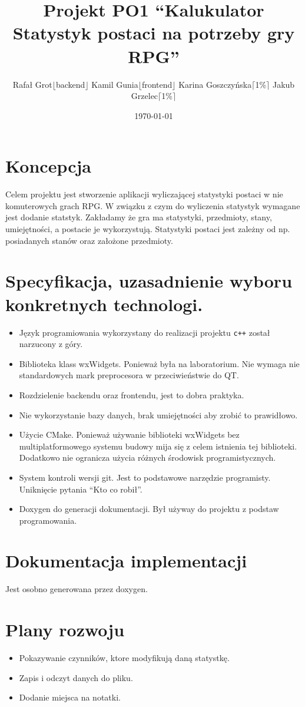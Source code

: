 \documentclass[11pt]{article}
\author{Rafał Grot\(\lfloor\)backend\(\rfloor\) Kamil Gunia\(\lfloor\)frontend\(\rfloor\) Karina Goszczyńska\(\lceil\)1\%\(\rceil\) Jakub Grzelec\(\lceil\)1\%\(\rceil\)}
\date{\today}
\title{Projekt PO1 ``Kalukulator Statystyk postaci na potrzeby gry RPG''}
\begin{document}
\maketitle
\tableofcontents

\newpage

\section{Koncepcja}
\label{sec:org64374a9}
Celem projektu jest stworzenie aplikacji wyliczającej statystyki postaci w nie komuterowych grach RPG.
W związku z czym do wyliczenia statystyk wymagane jest dodanie statstyk.
Zakładamy że gra ma statystyki, przedmioty, stany, umiejętności, a postacie je wykorzystują.
Statystyki postaci jest zależny od np. posiadanych stanów oraz założone przedmioty.
\section{Specyfikacja, uzasadnienie wyboru konkretnych technologi.}
\label{sec:orga7aaf80}
\begin{itemize}
\item Język programiowania wykorzystany do realizacji projektu \texttt{c++} został narzucony z góry.
\item Biblioteka klass wxWidgets. Ponieważ była na laboratorium. Nie wymaga nie standardowych mark preprocesora w przeciwieństwie do QT.
\item Rozdzielenie backendu oraz frontendu, jest to dobra praktyka.
\item Nie wykorzystanie bazy danych, brak umiejętności aby zrobić to prawidłowo.
\item Użycie CMake. Ponieważ używanie biblioteki wxWidgets bez multiplatformowego systemu budowy mija się z celem istnienia tej biblioteki. Dodatkowo nie ogranicza użycia różnych środowisk programistycznych.
\item System kontroli wersji git. Jest to podstawowe narzędzie programisty. Uniknięcie pytania ``Kto co robił''.
\item Doxygen do generacji dokumentacji. Był używay do projektu z podstaw programowania.
\end{itemize}
\section{Dokumentacja implementacji}
\label{sec:org0d384ae}
Jest osobno generowana przez doxygen.
\section{Plany rozwoju}
\label{sec:org3424e53}
\begin{itemize}
\item Pokazywanie czynników, ktore modyfikują daną statystkę.
\item Zapis i odczyt danych do pliku.
\item Dodanie miejsca na notatki.
\end{itemize}
\end{document}
